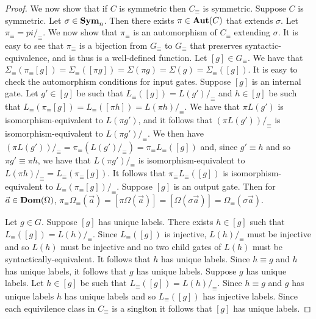 \documentclass[../paper.tex]{subfiles}
\begin{document}
\begin{proof}
  We now show that if $C$ is symmetric then $C_\equiv$ is symmetric. Suppose $C$
  is symmetric. Let $\sigma \in \text{\textbf{Sym}}_n$. Then there exists $\pi \in \text{\textbf{Aut}}(C)$
  that extends $\sigma$. Let $\pi_\equiv = pi /_\equiv$. We now show that
  $\pi_\equiv$ is an automorphism of $C_\equiv$ extending $\sigma$. It is easy
  to see that $\pi_\equiv$ is a bijection from $G_\equiv$ to $G_\equiv$ that
  preserves syntactic-equivalence, and is thus is a well-defined function. Let
  $[g] \in G_\equiv$. We have that $\Sigma_\equiv (\pi_\equiv [g]) =
  \Sigma_\equiv ([\pi g]) = \Sigma (\pi g) = \Sigma (g) = \Sigma_\equiv ([g])$.
  It is easy to check the automorphism conditions for input gates. Suppose $[g]$
  is an internal gate. Let $g' \in [g]$ be such that $L_\equiv([g]) = L(g')
  /_\equiv$ and $h \in [g]$ be such that $L_\equiv(\pi_\equiv[g]) = L_\equiv
  ([\pi h]) = L(\pi h) /_\equiv$. We have that $\pi L(g')$ is
  isomorphism-equivalent to $L(\pi g')$, and it follows that $(\pi
  L(g'))/_\equiv$ is isomorphism-equivalent to $L(\pi g') /_\equiv$. We then
  have $(\pi L(g'))/_\equiv = \pi_\equiv (L(g') /_\equiv) = \pi_\equiv L_\equiv
  ([g])$ and, since $g' \equiv h$ and so $\pi g' \equiv \pi h$, we have that
  $L(\pi g')/_\equiv$ is isomorphism-equivalent to $L(\pi h) /_\equiv =
  L_\equiv(\pi_\equiv[g])$. It follows that $\pi_\equiv L_\equiv ([g])$ is
  isomorphism-equivalent to $L_\equiv(\pi_\equiv [g]) /_\equiv$. Suppose $[g]$
  is an output gate. Then for $\vec{a} \in \text{\textbf{Dom}} (\Omega)$, $\pi_\equiv
  \Omega_\equiv (\vec{a}) = [\pi \Omega (\vec{a})] = [\Omega (\sigma \vec{a})] =
  \Omega_\equiv (\sigma \vec{a})$.

  Let $g \in G$. Suppose $[g]$ has unique labels. There exists $h \in [g]$ such
  that $L_\equiv([g]) = L(h) /_\equiv$. Since $L_\equiv([g])$ is injective,
  $L(h) /_\equiv$ must be injective and so $L(h)$ must be injective and no two
  child gates of $L(h)$ must be syntactically-equivalent. It follows that $h$
  has unique labels. Since $h \equiv g$ and $h$ has unique labels, it follows
  that $g$ has unique labels. Suppose $g$ has unique labels. Let $h \in [g]$ be
  such that $L_\equiv([g]) = L(h) /_\equiv$. Since $h \equiv g$ and $g$ has
  unique labels $h$ has unique labels and so $L_\equiv([g])$ has injective
  labels. Since each equivilence class in $C_\equiv$ is a singlton it follows
  that $[g]$ has unique labels.


  




\end{proof}
\end{document}
